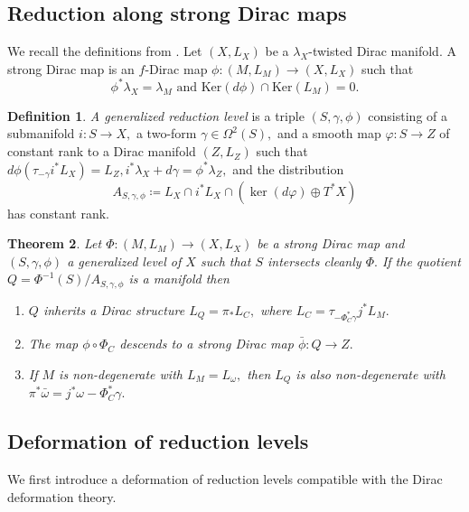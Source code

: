 \documentclass[reqno]{amsart}
\theoremstyle{plain}
\newtheorem{Thm}{Theorem}[section]
\theoremstyle{definition}
\newtheorem{Def}[Thm]{Definition}
\newcommand{\too}{\longrightarrow}
\newcommand{\Ker}{\text{Ker}}
\begin{document}
\subsection{Reduction along strong Dirac maps} We recall the definitions from \cite{bualibanu2026reduction}. Let $(X,L_X)$ be a $\lambda_X$-twisted Dirac manifold. A strong Dirac map \cite[]{bualibanu2026reduction} is an $f$-Dirac map $\phi: (M,L_M) \too (X,L_X)$ such that \begin{equation} \label{eq s Dirac}
    \phi^{*}\lambda_X = \lambda_M \text{ and } \Ker(d\phi) \cap \Ker(L_M) = 0.
\end{equation}

\begin{Def} \cite[Definition 2.2]{bualibanu2026reduction} \label{gen red level}
\textit{A generalized reduction level} is a triple $(S,\gamma,\phi)$ consisting of a submanifold $i: S\too X,$ a two-form $\gamma \in \Omega^{2}(S),$ and a smooth map $\varphi: S \too Z$ of constant rank to a Dirac manifold $(Z,L_Z)$ such that $d\phi(\tau_{-\gamma}i^{*}L_X) = L_Z, i^{*}\lambda_X + d\gamma = \phi^{*}\lambda_Z,$ and the distribution \begin{equation}
    A_{S,\gamma,\phi} \coloneqq L_X \cap i^{*}L_X \cap (\ker(d\varphi) \oplus T^{*}X) 
\end{equation}
has constant rank.
\end{Def}

\begin{Thm} \cite[Theorem 2.21]{bualibanu2026reduction} \label{reduction th}
Let $\Phi: (M,L_M) \too (X,L_X)$ be a strong Dirac map and $(S,\gamma,\phi)$ a generalized level of $X$ such that $S$ intersects cleanly $\Phi.$ If the quotient $Q = \Phi^{-1}(S)/A_{S,\gamma,\phi}$ is a manifold then \begin{enumerate}
    \item $Q$ inherits a Dirac structure $L_Q = \pi_{*}L_C,$ where $L_C = \tau_{-\Phi_{C}^{*}\gamma}j^{*}L_M.$
    \item The map $\phi \circ \Phi_C$ descends to a strong Dirac map $\bar{\phi}: Q \too Z.$
    \item If $M$ is non-degenerate with $L_M = L_\omega,$ then $L_Q$ is also non-degenerate with $\pi^{*}\bar{\omega} = j^{*}\omega - \Phi_{C}^{*}\gamma.$
\end{enumerate}
\end{Thm}

\subsection{Deformation of reduction levels}
We first introduce a deformation of reduction levels compatible with the Dirac deformation theory. 
\end{document}
